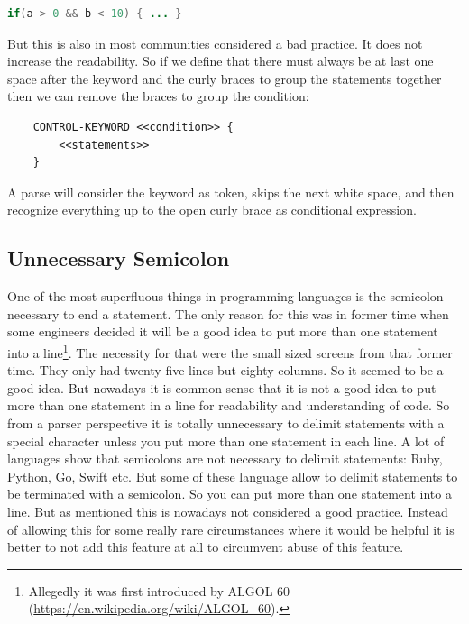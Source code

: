 \documentclass[11pt, a4paper]{report}
\begin{document}
\begin{lstlisting}[language=Java]
    if(a > 0 && b < 10) { ... }
\end{lstlisting}

\noindent But this is also in most communities considered a bad practice. It does not increase the readability. So if we define that there must always be at last one  space after the keyword and the curly braces to group the statements together  then we can remove the braces to group the condition:

\begin{lstlisting}
    CONTROL-KEYWORD <<condition>> { 
        <<statements>> 
    }
\end{lstlisting}

\noindent A parse will consider the keyword as token, skips the next white space, and then recognize everything up to the open curly brace as conditional expression.

\subsection{Unnecessary Semicolon}


One of the most superfluous things in programming languages is the semicolon necessary to end a statement. The only reason for this was in former time when some engineers decided it will be a good idea to put more than one statement into a line\footnote{Allegedly it was first introduced by ALGOL 60 (\url{https://en.wikipedia.org/wiki/ALGOL_60}).}. The necessity for that were the small sized screens from that former time. They only had twenty-five lines but eighty columns. So it seemed to be a good idea. But nowadays it is common sense that it is not a good idea to put more than one statement in a line for readability and understanding of code. So from a parser perspective it is totally unnecessary to delimit statements with a special character unless you put more than one statement in each line. A lot of languages show that semicolons are not necessary to delimit statements: Ruby, Python, Go, Swift etc. But some of these language allow to delimit statements to be terminated with a semicolon. So you can put more than one statement into a line. But as mentioned this is nowadays not considered a good practice. Instead of allowing this for some really rare circumstances where it would be helpful it is better to not add this feature at all to circumvent abuse of this feature.
\end{document}
